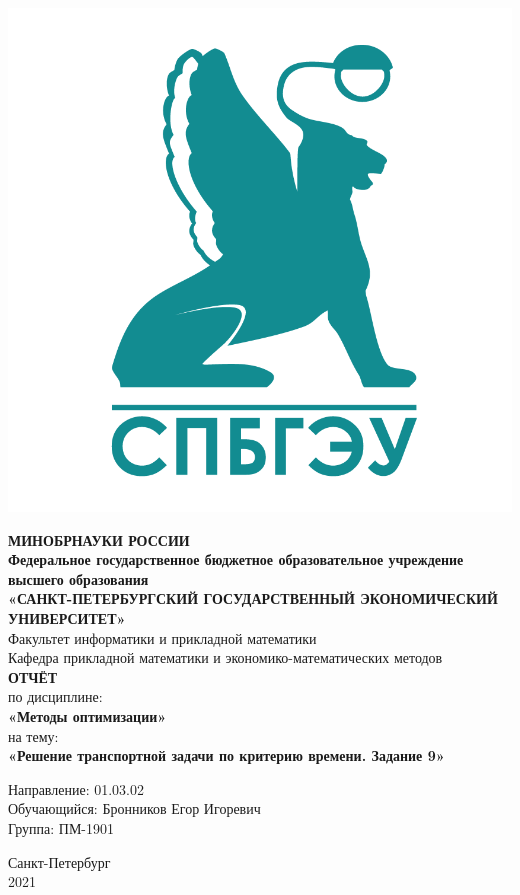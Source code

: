 \documentclass[14pt,a4paper,fleqn]{extarticle}
\begin{document}
	\begin{titlepage}
		\includegraphics[scale=0.12]{logo}
		\begin{center}
			\textbf{МИНОБРНАУКИ РОССИИ}\\
			\vspace{0.2cm}
			\textbf{Федеральное государственное бюджетное образовательное учреждение высшего образования}\\
			\textbf{«САНКТ-ПЕТЕРБУРГСКИЙ ГОСУДАРСТВЕННЫЙ ЭКОНОМИЧЕСКИЙ УНИВЕРСИТЕТ»}\\
			\vspace{0.6cm}
			Факультет информатики и прикладной математики\\
			Кафедра прикладной математики и экономико-математических методов\\
			\vspace{1cm}
			\textbf{ОТЧЁТ}\\
			по дисциплине:\\
			\textbf{«Методы оптимизации»}\\
			на тему:\\
			\textbf{«Решение транспортной задачи по критерию времени. Задание 9»}\\
		\end{center}
		\vspace{1cm}
		Направление: 01.03.02\\
		Обучающийся: Бронников Егор Игоревич\\
		Группа: ПМ-1901\\
		\vfill
		\begin{center}
			Санкт-Петербург\\
			2021\\
		\end{center}
	\end{titlepage}
\end{document}
